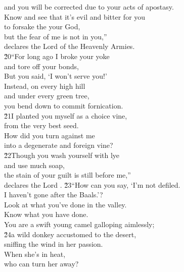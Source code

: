 \begin{poetry}
\poemll    and you will be corrected due to your acts of apostasy. \\
\poeml Know and see that it's evil and bitter for you \\
\poemll    to forsake the  your God, \\
\poeml but the fear of me is not in you,'' \\
\poemll    declares the Lord  of the Heavenly Armies. \\
\poeml \v{20}``For long ago I broke your yoke \\
\poemll    and tore off your bonds, \\
\poeml But you said, `I won't serve you!' \\
\poemll    Instead, on every high hill \\
\poeml and under every green tree, \\
\poemll    you bend down to commit fornication. \\
\poeml \v{21}I planted you myself as a choice vine, \\
\poemll    from the very best seed. \\
\poeml How did you turn against me \\
\poemll    into a degenerate and foreign vine? \\
\poeml \v{22}Though you wash yourself with lye \\
\poemll    and use much soap, \\
\poeml the stain of your guilt is still before me,'' \\
\poemlll       declares the Lord .
\poeml \v{23}``How can you say, `I'm not defiled. \\
\poemll    I haven't gone after the Baals.'? \\
\poeml Look at what you've done in the valley. \\
\poemll    Know what you have done. \\
\poemlll       You are a swift young camel galloping aimlessly; \\
\poeml \v{24}a wild donkey accustomed to the desert, \\
\poemll    sniffing the wind in her passion. \\
\poeml When she's in heat, \\
\poemll    who can turn her away? \\

\end{poetry}
